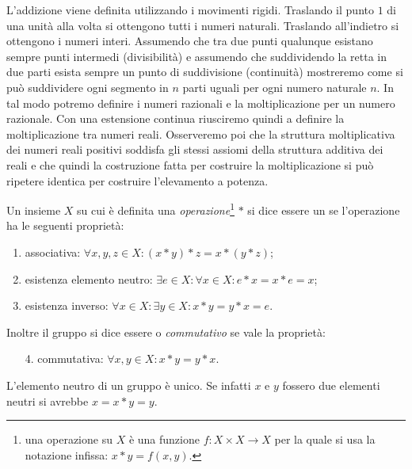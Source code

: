 L'addizione viene definita utilizzando i movimenti rigidi.
Traslando il punto $1$ di una unità alla volta si ottengono tutti i numeri naturali.
Traslando all'indietro si ottengono i numeri interi. 
Assumendo che tra due punti qualunque esistano sempre punti intermedi (divisibilità) e
assumendo che suddividendo la retta in due parti esista sempre un punto di 
suddivisione (continuità) mostreremo come si può suddividere 
ogni segmento in $n$ parti uguali per ogni numero naturale $n$. 
In tal modo potremo definire i numeri razionali e la moltiplicazione per un numero razionale.
Con una estensione continua riusciremo quindi a definire la moltiplicazione 
tra numeri reali. 
Osserveremo poi che la struttura moltiplicativa dei numeri reali positivi soddisfa 
gli stessi assiomi della struttura additiva dei reali e che quindi la costruzione fatta 
per costruire la moltiplicazione si può ripetere identica per costruire l'elevamento a potenza.

\begin{definition}[gruppo]
Un insieme $X$ su cui è definita una \emph{operazione}\footnote{%
una operazione su $X$ è una funzione $f\colon X\times X \to X$ per la quale
si usa la notazione infissa: $x*y = f(x,y)$.}
$*$ si dice essere un  se l'operazione
ha le seguenti proprietà:
\begin{enumerate}
  \item associativa: $\forall x,y,z\in X\colon (x*y)*z = x*(y*z)$;
  \item esistenza elemento neutro: $\exists e\in X\colon \forall x\in X \colon e*x=x*e = x$;
  \item esistenza inverso: $\forall x\in X\colon \exists y\in X\colon x*y=y*x=e$.
\end{enumerate}
Inoltre il gruppo si dice essere  o \emph{commutativo}
se vale la proprietà:
\begin{enumerate}
  \item[4.] commutativa: $\forall x,y\in X\colon x*y = y*x$.
\end{enumerate}
\end{definition}

L'elemento neutro di un gruppo è unico. Se infatti $x$ e $y$ fossero due elementi neutri 
si avrebbe $x = x*y = y$.

